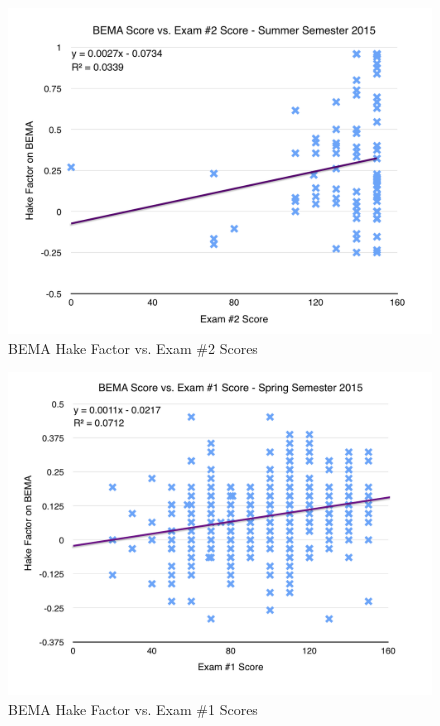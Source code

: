 \begin{figure}[!htb]
	\centering
	\includegraphics[width=6in]{img/chapter4/bema_vs_ex2_su15}
	\caption[BEMA Hake Factor vs. Exam \#2 Scores]{BEMA Hake Factor vs. Exam \#2 Scores}
  \label{fig:bemaVsExTwoSu15}
\end{figure}

\begin{figure}[!htb]
	\centering
	\includegraphics[width=6in]{img/chapter4/bema_vs_ex1_sp15}
	\caption[BEMA Hake Factor vs. Exam \#1 Scores]{BEMA Hake Factor vs. Exam \#1 Scores}
  \label{fig:bemaVsExOneSp15}
\end{figure}

